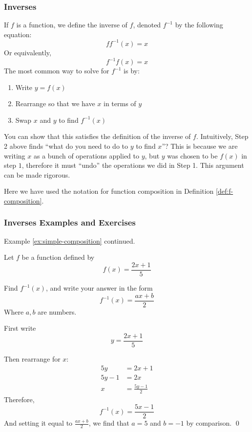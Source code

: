 \subsubsection{Inverses} \label{sec:function-inverse}
\begin{definition} \label{def:f-inverse}
    If $f$ is a function, we define the inverse of $f$, denoted $f^{-1}$ by the following equation:
    \[ ff^{-1}(x) = x \]
    Or equivalently, 
    \[ f^{-1}f(x) = x \]
    The most common way to solve for $f^{-1}$ is by: 
    \begin{enumerate} 
        \item Write $y = f(x)$
        \item Rearrange so that we have $x$ in terms of $y$
        \item Swap $x$ and $y$ to find $f^{-1}(x)$
    \end{enumerate}
    You can show that this satisfies the definition of the inverse of $f$. 
    Intuitively, Step 2 above finds ``what do you need to do to $y$ to find $x$''? This is because we are writing $x$ as a bunch of operations 
    applied to $y$, but $y$ was chosen to be $f(x)$ in step $1$, therefore it must ``undo'' the operations we did in Step 1. This argument can be 
    made rigorous.
\end{definition}
Here we have used the notation for function composition in Definition \ref{def:f-composition}.

\subsubsection{Inverses Examples and Exercises}
\begin{example} \label{ex:simple-inverse}
    Example \ref{ex:simple-composition} continued.

    Let $f$ be a function defined by 
    \[ f(x) = \frac{2x + 1}{5}\]

    Find $f^{-1}(x)$, and write your answer in the form
    \[f^{-1}(x) = \frac{ax + b}{2}\]
    Where $a,b$ are numbers.


\end{example}
\begin{solution}
    First write 
    \[y = \frac{2x + 1}{5}\]

    Then rearrange for $x$:
    \begin{align*}
        5y &= 2x+1 \tag{multiply by 5}\\
        5y -1 &= 2x \tag{minus 1}\\
        x &= \frac{5y - 1}{2} \tag{divide by 2}
    \end{align*}
    Therefore,
    \[ f^{-1}(x) = \frac{5x - 1}{2}\]
    And setting it equal to $\frac{ax + b}{2}$, we find that $a = 5$ and $b = -1$ by comparison.
    \qed
\end{solution}

